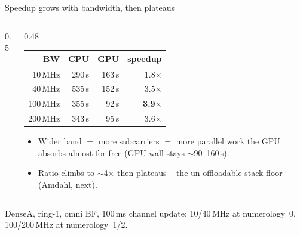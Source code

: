 \documentclass[aspectratio=169,11pt]{beamer}
\begin{document}
\begin{frame}{Speedup grows with bandwidth, then plateaus}
  \begin{columns}[c]
  \begin{column}{0.5\textwidth}
    \centering
  \end{column}
  \begin{column}{0.48\textwidth}\small
    \centering
    \begin{tabular}{rrrr}
      \toprule
      BW & CPU & GPU & speedup\\
      \midrule
      10\,MHz  & 290\,s & 163\,s & 1.8$\times$\\
      40\,MHz  & 535\,s & 152\,s & 3.5$\times$\\
      100\,MHz & 355\,s & \phantom{0}92\,s & \textbf{3.9$\times$}\\
      200\,MHz & 343\,s & \phantom{0}95\,s & 3.6$\times$\\
      \bottomrule
    \end{tabular}
    \vspace{0.6em}
    \begin{itemize}\footnotesize
      \item Wider band $=$ more subcarriers $=$ more \alert{parallel} work the
            GPU absorbs almost for free (GPU wall stays $\sim$90--160\,s).
      \item Ratio climbs to \alert{$\sim$4$\times$} then plateaus -- the
            un-offloadable stack floor (Amdahl, next).
    \end{itemize}
  \end{column}
  \end{columns}
  \vspace{0.2em}
  {\scriptsize DenseA, ring-1, omni BF, 100\,ms channel update;
   10/40\,MHz at numerology~0, 100/200\,MHz at numerology~1/2.}
\end{frame}
\end{document}
